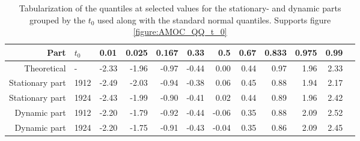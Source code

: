     \begin{table}[h!]
        \centering
        \begin{tabular}{rllrrrrrrrrr}
          \hline
         Part & $t_0$ & 0.01 & 0.025 & 0.167 & 0.33 & 0.5 & 0.67 & 0.833 & 0.975 & 0.99 \\ 
          \hline
        Theoretical & - & -2.33 & -1.96 & -0.97 & -0.44 & 0.00 & 0.44 & 0.97 & 1.96 & 2.33 \\ 
        Stationary part & 1912 & -2.49 & -2.03 & -0.94 & -0.38 & 0.06 & 0.45 & 0.88 & 1.94 & 2.17 \\ 
        Stationary part & 1924 & -2.43 & -1.99 & -0.90 & -0.41 & 0.02 & 0.44 & 0.89 & 1.96 & 2.42 \\ 
        Dynamic part & 1912 & -2.20 & -1.79 & -0.92 & -0.44 & -0.06 & 0.35 & 0.88 & 2.09 & 2.52 \\ 
        Dynamic part & 1924 & -2.20 & -1.75 & -0.91 & -0.43 & -0.04 & 0.35 & 0.86 & 2.09 & 2.45 \\ 
           \hline
        \end{tabular}
        \caption{Tabularization of the quantiles at selected values for the stationary- and dynamic parts grouped by the $t_0$ used along with the standard normal quantiles. Supports figure \ref{figure:AMOC_QQ_t_0}}
        \label{table:QQ_table_parts}
        \end{table}
    
